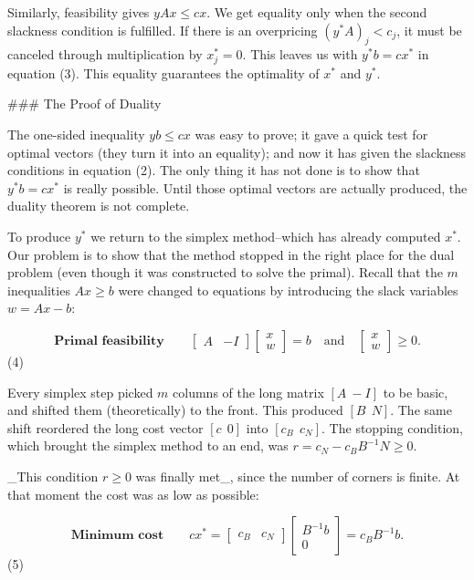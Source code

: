 Similarly, feasibility gives \(yAx\leq cx\). We get equality only when the second slackness condition is fulfilled. If there is an overpricing \((y^{*}A)_{j}<c_{j}\), it must be canceled through multiplication by \(x_{j}^{*}=0\). This leaves us with \(y^{*}b=cx^{*}\) in equation (3). This equality guarantees the optimality of \(x^{*}\) and \(y^{*}\).

### The Proof of Duality

The one-sided inequality \(yb\leq cx\) was easy to prove; it gave a quick test for optimal vectors (they turn it into an equality); and now it has given the slackness conditions in equation (2). The only thing it has not done is to show that \(y^{*}b=cx^{*}\) is really possible. Until those optimal vectors are actually produced, the duality theorem is not complete.

To produce \(y^{*}\) we return to the simplex method--which has already computed \(x^{*}\). Our problem is to show that the method stopped in the right place for the dual problem (even though it was constructed to solve the primal). Recall that the \(m\) inequalities \(Ax\geq b\) were changed to equations by introducing the slack variables \(w=Ax-b\):

\[\textbf{Primal feasibility}\qquad\begin{bmatrix}A&-I\end{bmatrix}\begin{bmatrix} x\\ w\end{bmatrix}=b\quad\text{and}\quad\begin{bmatrix}x\\ w\end{bmatrix}\geq 0.\] (4)

Every simplex step picked \(m\) columns of the long matrix \([A\ -I]\) to be basic, and shifted them (theoretically) to the front. This produced \([B\ \ N]\). The same shift reordered the long cost vector \([c\ \ 0]\) into \([c_{B}\ \ c_{N}]\). The stopping condition, which brought the simplex method to an end, was \(r=c_{N}-c_{B}B^{-1}N\geq 0\).

_This condition \(r\geq 0\) was finally met_, since the number of corners is finite. At that moment the cost was as low as possible:

\[\textbf{Minimum cost}\qquad cx^{*}=\begin{bmatrix}c_{B}&c_{N}\end{bmatrix} \begin{bmatrix}B^{-1}b\\ 0\end{bmatrix}=c_{B}B^{-1}b.\] (5)

